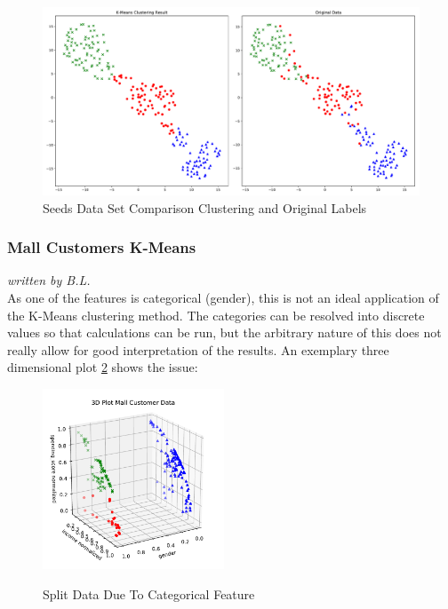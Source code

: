 \begin{figure}[H]
\caption{Seeds Data Set Comparison Clustering and Original Labels}
\begin{center}
\includegraphics[width=1.0\textwidth]{images/kmeans_seeds_tsne.pdf}
\end{center}
\label{fig:kmeans_seeds_tsne}
\end{figure}


\subsubsection{Mall Customers K-Means}
\textit{written by B.L.}\\

As one of the features is categorical (gender), this is not an ideal application of the K-Means clustering method. The categories can be resolved into discrete values so that calculations can be run, but the arbitrary nature of this does not really allow for good interpretation of the results. An exemplary three dimensional plot \ref{fig:kmeans_customers_3d} shows the issue: 

\begin{figure}
  \centering
    \includegraphics[width=0.48\textwidth, clip]{images/kmeans_customers_3d.pdf}
  \label{fig:kmeans_customers_3d}
  \caption{Split Data Due To {Categorical} Feature}
\end{figure}

